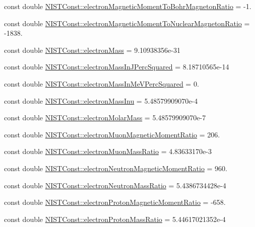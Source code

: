 \begin{DoxyCompactItemize}
\item 
const double \hyperlink{group___electron_ga921889f482e157189bf19818e428532f}{N\+I\+S\+T\+Const\+::electron\+Magnetic\+Moment\+To\+Bohr\+Magneton\+Ratio} = -\/1.
\item 
const double \hyperlink{group___electron_ga2c0f984bb3ae4dd8ca2696d4fec8f9bf}{N\+I\+S\+T\+Const\+::electron\+Magnetic\+Moment\+To\+Nuclear\+Magneton\+Ratio} = -\/1838.
\item 
const double \hyperlink{group___electron_ga2c9773ce81cfbe85e9042adccd788589}{N\+I\+S\+T\+Const\+::electron\+Mass} = 9.\+10938356e-\/31
\item 
const double \hyperlink{group___electron_gad128828903af19e91fdc1a95ef9cbb24}{N\+I\+S\+T\+Const\+::electron\+Mass\+In\+J\+Perc\+Squared} = 8.\+18710565e-\/14
\item 
const double \hyperlink{group___electron_ga6a41b7cbd78c00ef17e9b17944ab5f5c}{N\+I\+S\+T\+Const\+::electron\+Mass\+In\+Me\+V\+Perc\+Squared} = 0.
\item 
const double \hyperlink{group___electron_gaa6fc2ab3a81cd61f6d78d64eec8a670d}{N\+I\+S\+T\+Const\+::electron\+Mass\+Inu} = 5.\+48579909070e-\/4
\item 
const double \hyperlink{group___electron_gaebecd54c70326d72d25d790c0ab62145}{N\+I\+S\+T\+Const\+::electron\+Molar\+Mass} = 5.\+48579909070e-\/7
\item 
const double \hyperlink{group___electron_gacd4a3b462095f6b3ec3de099a34b9726}{N\+I\+S\+T\+Const\+::electron\+Muon\+Magnetic\+Moment\+Ratio} = 206.
\item 
const double \hyperlink{group___electron_ga6b6bb303de5ee3bd95d18e8024880eea}{N\+I\+S\+T\+Const\+::electron\+Muon\+Mass\+Ratio} = 4.\+83633170e-\/3
\item 
const double \hyperlink{group___electron_ga556c66115bf01b011616c5675e8b33c1}{N\+I\+S\+T\+Const\+::electron\+Neutron\+Magnetic\+Moment\+Ratio} = 960.
\item 
const double \hyperlink{group___electron_gad051ac865a63e667306850054f912ab1}{N\+I\+S\+T\+Const\+::electron\+Neutron\+Mass\+Ratio} = 5.\+4386734428e-\/4
\item 
const double \hyperlink{group___electron_ga8ea70b9b79c3f8b4f9825c48d1758f44}{N\+I\+S\+T\+Const\+::electron\+Proton\+Magnetic\+Moment\+Ratio} = -\/658.
\item 
const double \hyperlink{group___electron_gabbaa23094e18f2b83e6145adaebbb6e7}{N\+I\+S\+T\+Const\+::electron\+Proton\+Mass\+Ratio} = 5.\+44617021352e-\/4

\end{DoxyCompactItemize}
